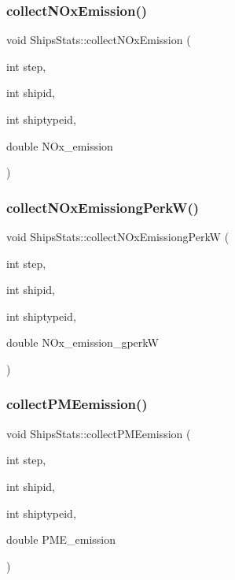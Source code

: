 \mbox{\label{class_ships_stats_a0cd13c776aa516de361de4f151bcee42}} 
\subsubsection{\texorpdfstring{collectNOxEmission()}{collectNOxEmission()}}
{\footnotesize\ttfamily void Ships\+Stats\+::collect\+N\+Ox\+Emission (\begin{DoxyParamCaption}\item[{int}]{step,  }\item[{int}]{shipid,  }\item[{int}]{shiptypeid,  }\item[{double}]{N\+Ox\+\_\+emission }\end{DoxyParamCaption})}

\mbox{\label{class_ships_stats_a4d1aa1437ee63767ccb7d9a0b51d2ae9}} 
\subsubsection{\texorpdfstring{collectNOxEmissiongPerkW()}{collectNOxEmissiongPerkW()}}
{\footnotesize\ttfamily void Ships\+Stats\+::collect\+N\+Ox\+Emissiong\+PerkW (\begin{DoxyParamCaption}\item[{int}]{step,  }\item[{int}]{shipid,  }\item[{int}]{shiptypeid,  }\item[{double}]{N\+Ox\+\_\+emission\+\_\+gperkW }\end{DoxyParamCaption})}

\mbox{\label{class_ships_stats_a32e7d6dcefcacae5ad107688d731bdf3}} 
\subsubsection{\texorpdfstring{collectPMEemission()}{collectPMEemission()}}
{\footnotesize\ttfamily void Ships\+Stats\+::collect\+P\+M\+Eemission (\begin{DoxyParamCaption}\item[{int}]{step,  }\item[{int}]{shipid,  }\item[{int}]{shiptypeid,  }\item[{double}]{P\+M\+E\+\_\+emission }\end{DoxyParamCaption})}

